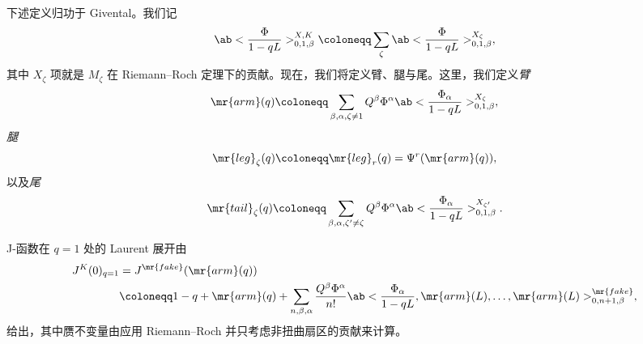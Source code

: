 %
%

下述定义归功于 Givental。我们记
\[ \ab<\frac{\Phi}{1-qL}>_{0,1,\beta}^{X,K} \coloneqq \sum_{\zeta} \ab<\frac{\Phi}{1-qL}>_{0,1,\beta}^{X_{\zeta}}, \]
其中 \(X_{\zeta}\) 项就是 \(M_{\zeta}\) 在 Riemann–Roch 定理下的贡献。现在，我们将定义臂、腿与尾。这里，我们定义\textit{臂}
\[ \mr{arm}(q) \coloneqq \sum_{\beta, \alpha, \zeta \neq 1} Q^{\beta} \Phi^{\alpha}\ab<\frac{\Phi_{\alpha}}{1-qL}>_{0,1,\beta}^{X_{\zeta}}, \]
\textit{腿}
\[ \mr{leg}_{\zeta}(q) \coloneqq \mr{leg}_r(q) = \Psi^r (\mr{arm}(q)), \]
以及\textit{尾}
\[ \mr{tail}_{\zeta}(q) \coloneqq \sum_{\beta, \alpha, \zeta' \neq \zeta} Q^{\beta} \Phi^{\alpha} \ab<\frac{\Phi_{\alpha}}{1-qL}>_{0,1,\beta}^{X_{\zeta'}}. \]

\begin{prop}
    J-函数在 \(q = 1\) 处的 Laurent 展开由
    \begin{align*}
        J^K(0)_{q=1} &= J^{\mr{fake}}(\mr{arm}(q)) \\
        &\coloneqq 1-q + \mr{arm}(q) + \sum_{n,\beta,\alpha} \frac{Q^{\beta}\Phi^{\alpha}}{n!} \ab<\frac{\Phi_{\alpha}}{1-qL}, \mr{arm}(L), \ldots, \mr{arm}(L)>_{0,n+1,\beta}^{\mr{fake}},
    \end{align*}
    给出，其中赝不变量由应用 Riemann–Roch 并只考虑非扭曲扇区的贡献来计算。
\end{prop}

